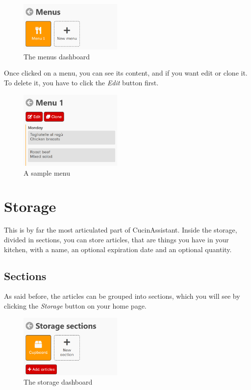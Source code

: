 \documentclass[12pt, a4paper]{report}
\begin{document}
    \begin{figure}[H]
        \centering
        \includegraphics[width=0.45\textwidth]{assets/en/menus.png}
        \caption{The menus dashboard}
    \end{figure}

    Once clicked on a menu, you can see its content, and if you want edit or clone it. To delete it, you have to
    click the \emph{Edit} button first.

    \begin{figure}[H]
        \centering
        \includegraphics[width=0.45\textwidth]{assets/en/menu.png}
        \caption{A sample menu}
    \end{figure}



    \chapter{Storage}

    This is by far the most articulated part of CucinAssistant.
    Inside the storage, divided in sections, you can store articles, that are things you have in your kitchen, with a name,
    an optional expiration date and an optional quantity.

    \section{Sections}

    As said before, the articles can be grouped into sections, which you will see by clicking the \emph{Storage} button on
    your home page.

    \begin{figure}[H]
        \centering
        \includegraphics[width=0.45\textwidth]{assets/en/sections.png}
        \caption{The storage dashboard}
    \end{figure}
\end{document}
